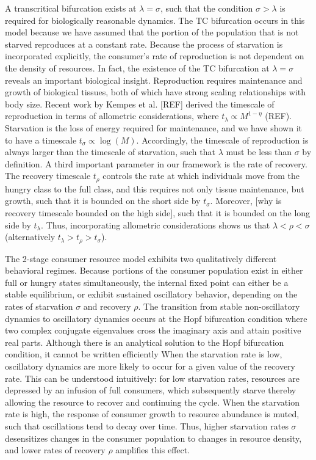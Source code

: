 \documentclass[12pt,english]{article}
\begin{document}
\begin{spacing}{1.9}
A transcritical bifurcation exists at $\lambda = \sigma$, such that the condition $\sigma > \lambda$ is required for biologically reasonable dynamics.
The TC bifurcation occurs in this model because we have assumed that the portion of the population that is not starved reproduces at a constant rate.
Because the process of starvation is incorporated explicitly, the consumer's rate of reproduction is not dependent on the density of resources.
In fact, the existence of the TC bifurcation at $\lambda = \sigma$ reveals an important biological insight. 
Reproduction requires maintenance and growth of biological tissues, both of which have strong scaling relationships with body size.
Recent work by Kempes et al. [REF] derived the timescale of reproduction in terms of allometric considerations, where $t_\lambda \propto M^{1-\eta}$ (REF).
Starvation is the loss of energy required for maintenance, and we have shown it to have a timescale $t_\sigma \propto \log(M)$.
Accordingly, the timescale of reproduction is always larger than the timescale of starvation, such that $\lambda$ must be less than $\sigma$ by definition.
A third important parameter in our framework is the rate of recovery.
The recovery timescale $t_\rho$ controls the rate at which individuals move from the hungry class to the full class, and this requires not only tissue maintenance, but growth, such that it is bounded on the short side by $t_\sigma$.
Moreover, [why is recovery timescale bounded on the high side], such that it is bounded on the long side by $t_\lambda$.
Thus, incorporating allometric considerations shows us that $\lambda < \rho < \sigma$ (alternatively $t_\lambda > t_\rho > t_\sigma$).

The 2-stage consumer resource model exhibits two qualitatively different behavioral regimes.
Because portions of the consumer population exist in either full or hungry states simultaneously, the internal fixed point can either be a stable equilibrium, or exhibit sustained oscillatory behavior, depending on the rates of starvation $\sigma$ and recovery $\rho$.
The transition from stable non-oscillatory dynamics to oscillatory dynamics occurs at the Hopf bifurcation condition where two complex conjugate eigenvalues cross the imaginary axis and attain positive real parts.
Although there is an analytical solution to the Hopf bifurcation condition, it cannot be written efficiently
When the starvation rate is low, oscillatory dynamics are more likely to occur for a given value of the recovery rate.
This can be understood intuitively: for low starvation rates, resources are depressed by an infusion of full consumers, which subsequently starve thereby allowing the resource to recover and continuing the cycle.
When the starvation rate is high, the response of consumer growth to resource abundance is muted, such that oscillations tend to decay over time.
Thus, higher starvation rates $\sigma$ desensitizes changes in the consumer population to changes in resource density, and lower rates of recovery $\rho$ amplifies this effect.


\end{spacing}
\end{document}

